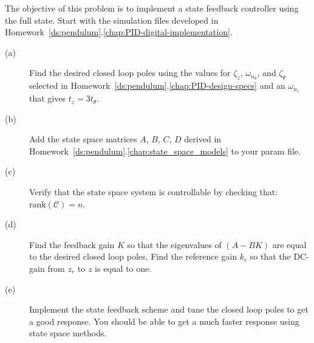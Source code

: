 The objective of this problem is to implement a state feedback controller using the full state.
Start with the simulation files developed in Homework~\ref{ds:pendulum}.\ref{chap:PID-digital-implementation}.
\begin{description}
\item[(a)] Find the desired closed loop poles using the values for $\zeta_z$, $\omega_{n_{\theta}}$, and $\zeta_{\theta}$ selected in Homework~\ref{ds:pendulum}.\ref{chap:PID-design-specs} and an  $\omega_{n_z}$ that gives $t_z=3 t_{\theta}$.   
\item[(b)] Add the state space matrices $A$, $B$, $C$, $D$ derived in Homework~\ref{ds:pendulum}.\ref{chap:state_space_models} to your param file.
\item[(c)] Verify that the state space system is controllable by checking that: $\text{rank}(\mathcal{C})=n$.
\item[(d)] Find the feedback gain $K$ so that the eigenvalues of $(A-BK)$ are equal to the desired closed loop poles.  Find the reference gain $k_r$ so that the DC-gain from $z_r$ to $z$ is equal to one.  
\item[(e)] Implement the state feedback scheme and tune the closed loop poles to get a good response.  You should be able to get a much faster response using state space methods.
\end{description}

